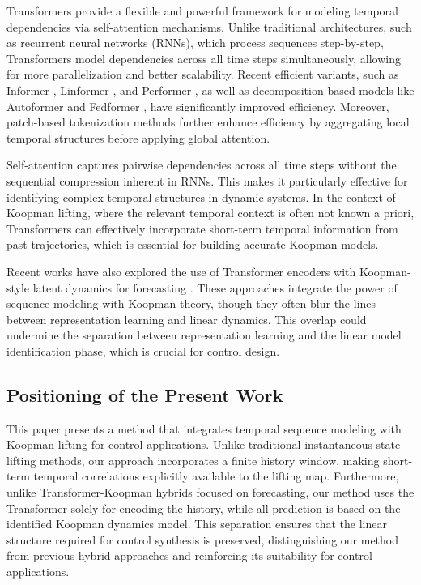 \documentclass[journal]{IEEEtran}
\begin{document}
Transformers \cite{vaswani2017attention} provide a flexible and powerful framework for modeling temporal dependencies via self-attention mechanisms. Unlike traditional architectures, such as recurrent neural networks (RNNs), which process sequences step-by-step, Transformers model dependencies across all time steps simultaneously, allowing for more parallelization and better scalability. Recent efficient variants, such as Informer \cite{zhou2021informer}, Linformer \cite{wang2020linformer}, and Performer \cite{choromanski2021performer}, as well as decomposition-based models like Autoformer \cite{wu2021autoformer} and Fedformer \cite{zhou2022fedformer}, have significantly improved efficiency. Moreover, patch-based tokenization methods \cite{nie2023time} further enhance efficiency by aggregating local temporal structures before applying global attention.

Self-attention captures pairwise dependencies across all time steps without the sequential compression inherent in RNNs. This makes it particularly effective for identifying complex temporal structures in dynamic systems. In the context of Koopman lifting, where the relevant temporal context is often not known a priori, Transformers can effectively incorporate short-term temporal information from past trajectories, which is essential for building accurate Koopman models.

Recent works have also explored the use of Transformer encoders with Koopman-style latent dynamics for forecasting \cite{forootani2026deepkoopformer, forootani2026spectral}. These approaches integrate the power of sequence modeling with Koopman theory, though they often blur the lines between representation learning and linear dynamics. This overlap could undermine the separation between representation learning and the linear model identification phase, which is crucial for control design.

\subsection{Positioning of the Present Work}
\label{subsec:positioning}

This paper presents a method that integrates temporal sequence modeling with Koopman lifting for control applications. Unlike traditional instantaneous-state lifting methods, our approach incorporates a finite history window, making short-term temporal correlations explicitly available to the lifting map. Furthermore, unlike Transformer-Koopman hybrids focused on forecasting, our method uses the Transformer solely for encoding the history, while all prediction is based on the identified Koopman dynamics model. This separation ensures that the linear structure required for control synthesis is preserved, distinguishing our method from previous hybrid approaches and reinforcing its suitability for control applications. 
\end{document}

